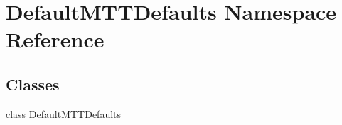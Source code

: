 \hypertarget{namespace_default_m_t_t_defaults}{\section{Default\-M\-T\-T\-Defaults Namespace Reference}
\label{namespace_default_m_t_t_defaults}
}
\subsection*{Classes}
\begin{DoxyCompactItemize}
\item 
class \hyperlink{class_default_m_t_t_defaults_1_1_default_m_t_t_defaults}{Default\-M\-T\-T\-Defaults}
\end{DoxyCompactItemize}
